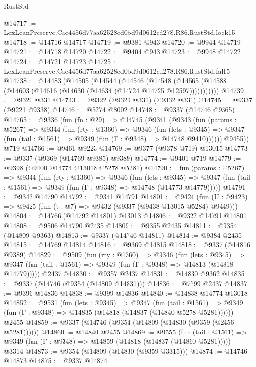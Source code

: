 \begin{lexlean}{RustStd}
\begin{coremodule}
@14717 := LexLeanPreserve.Cae4456d77aa62528ed0bd9d0612cd278.R86.RustStd.look15
@14718 := @14716 @14717
@14719 := @9381 @943
@14720 := @9944 @14719
@14721 := @14718 @14720
@14722 := @9404 @943
@14723 := @9948 @14722
@14724 := @14721 @14723
@14725 := LexLeanPreserve.Cae4456d77aa62528ed0bd9d0612cd278.R86.RustStd.fal15
@14738 := @14483
    (@14505
      (@14544
        (@14546
          (@14548 (@14565 (@14588 (@14603 (@14616 (@14630 (@14634 (@14724 @14725 @12597)))))))))))
@14739 := @9320 @331
@14743 := @9322 (@9326 @331) (@9332 @331)
@14745 := @9337 (@9221 @9338)
@14746 := @5274 @8002
@14748 := @9337 (@14746 @9365)
@14765 := @9336
    (fun (fn : @29) =>
    @14745
      (@9341
        (@9343
          (fun (params : @5267) =>
          @9344
            (fun (rty : @1360) =>
            @9346
              (fun (lets : @9345) =>
              @9347 (fun (tail : @1561) => @9349 (fun (Γ : @9348) => @14748 @9410))))))
        @9455))
    @719
@14766 := @9461 @9223
@14769 := @9377 (@9378 @719) @13015
@14773 := @9337 (@9369 (@14769 @9385) @9389)
@14774 := @9401 @719
@14779 := @9398 (@9400 @14774 @13018 @5278 @5281)
@14790 := fun (params : @5267) =>
  @9344
    (fun (rty : @1360) =>
    @9346
      (fun (lets : @9345) =>
      @9347 (fun (tail : @1561) => @9349 (fun (Γ : @9348) => @14748 (@14773 @14779)))))
@14791 := @9343 @14790
@14792 := @9341 @14791
@14801 := @9424
    (fun (U : @9423) => @9425 (fun (t : @7) => @9432 (@9337 (@9438 @13015 @5284) @9449)))
@14804 := @14766 (@14792 @14801) @13013
@14806 := @9322 @14791 @14801
@14808 := @9506 @14790 @2435
@14809 := @9355 @2435
@14811 := @9354 (@14809 @9363)
@14813 := @9337 (@14746 @14811)
@14814 := @9384 @2435
@14815 := @14769 @14814
@14816 := @9369 @14815
@14818 := @9337 (@14816 @9389)
@14829 := @9509
    (fun (rty : @1360) =>
    @9346
      (fun (lets : @9345) =>
      @9347 (fun (tail : @1561) => @9349 (fun (Γ : @9348) => @14813 (@14818 @14779)))))
    @2437
@14830 := @9357 @2437
@14831 := @14830 @9362
@14835 := @9337 (@14746 (@9354 (@14809 @14831)))
@14836 := @7799 @2437
@14837 := @9396 @14836
@14838 := @9399 @14836
@14840 := @14838 @14774 @13018
@14852 := @9531
    (fun (lets : @9345) =>
    @9347
      (fun (tail : @1561) =>
      @9349 (fun (Γ : @9348) => @14835 (@14818 (@14837 (@14840 @5278 @5281))))))
    @2455
@14859 := @9337 (@14746 (@9354 (@14809 (@14830 (@9359 (@2456 @5281))))))
@14860 := @14840 @2455
@14869 := @9555
    (fun (tail : @1561) => @9349 (fun (Γ : @9348) => @14859 (@14818 (@14837 (@14860 @5281)))))
    @3314
@14873 := @9354 (@14809 (@14830 (@9359 @3315)))
@14874 := @14746 @14873
@14875 := @9337 @14874

\end{coremodule}
\end{lexlean}
